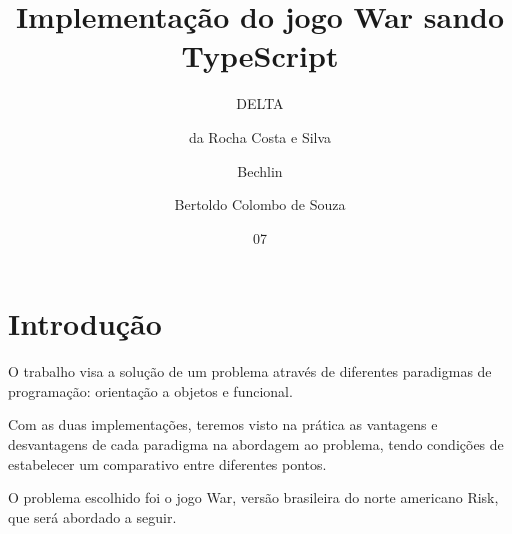 \documentclass[rel_mlp]{iiufrgs}
\title{Implementação do jogo War sando TypeScript}
\author{DELTA}{GRUPO} %
\author{da Rocha Costa e Silva}{Átila} %
\author{Bechlin}{Béuren Felipe}
\author{Bertoldo Colombo de Souza}{Felipe}
\date{07}{2018}
\begin{document}
\maketitle


\tableofcontents








%
\chapter{Introdução} \label{intro}
O trabalho visa a solução de um problema através de diferentes paradigmas de programação: orientação a objetos e funcional. \par
Com as duas implementações, teremos visto na prática as vantagens e desvantagens de cada paradigma na abordagem ao problema, tendo condições de estabelecer um comparativo entre diferentes pontos. \par
O problema escolhido foi o jogo War, versão brasileira do norte americano Risk, que será abordado a seguir.
\end{document}
